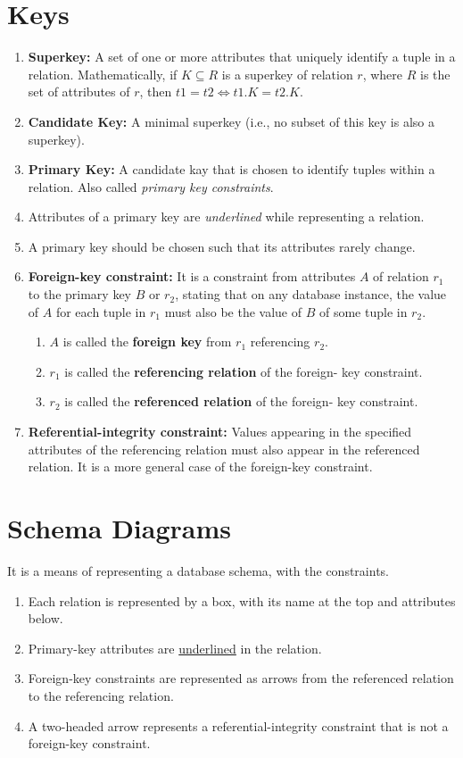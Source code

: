 \documentclass[journal,12pt,twocolumn]{IEEEtran}
\begin{document}
\section{Keys}
\begin{enumerate}
    \item \textbf{Superkey:} A set of one or more attributes that uniquely 
    identify a tuple in a relation. Mathematically, if $K \subseteq R$ is a 
    superkey of relation $r$, where $R$ is the set of attributes of $r$, then 
    $t1 = t2 \iff t1.K = t2.K$.
    \item \textbf{Candidate Key:} A minimal superkey (i.e., no subset of this 
    key is also a superkey).
    \item \textbf{Primary Key:} A candidate kay that is chosen to identify 
    tuples within a relation. Also called \textit{primary key constraints}.
    \item Attributes of a primary key are \textit{underlined} while representing
    a relation.
    \item A primary key should be chosen such that its attributes rarely change.
    \item \textbf{Foreign-key constraint:} It is a constraint from attributes 
    $A$ of relation $r_1$ to the primary key $B$ or $r_2$, stating that on any 
    database instance, the value of $A$ for each tuple in $r_1$ must also be 
    the value of $B$ of some tuple in $r_2$.
    \begin{enumerate}
        \item $A$ is called the \textbf{foreign key} from $r_1$ referencing 
        $r_2$.
        \item $r_1$ is called the \textbf{referencing relation} of the foreign-
        key constraint.
        \item $r_2$ is called the \textbf{referenced relation} of the foreign-
        key constraint.
    \end{enumerate}
\item \textbf{Referential-integrity constraint:} Values appearing in the 
specified attributes of the referencing relation must also appear in the 
referenced relation. It is a more general case of the foreign-key constraint.
\end{enumerate}

\section{Schema Diagrams}

It is a means of representing a database schema, with the constraints.
\begin{enumerate}
    \item Each relation is represented by a box, with its name at the top and 
    attributes below.
    \item Primary-key attributes are \underline{underlined} in the relation.
    \item Foreign-key constraints are represented as arrows from the referenced 
    relation to the referencing relation.
    \item A two-headed arrow represents a referential-integrity constraint that 
    is not a foreign-key constraint.
\end{enumerate}
\end{document}
